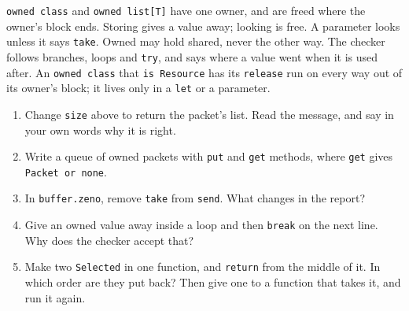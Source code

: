 \begin{summary}
\verb|owned class| and \verb|owned list[T]| have one owner, and are
freed where the owner's block ends. Storing gives a value away; looking
is free. A parameter looks unless it says \verb|take|. Owned may hold
shared, never the other way. The checker follows branches, loops and
\verb|try|, and says where a value went when it is used after. An
\verb|owned class| that \verb|is Resource| has its \verb|release| run
on every way out of its owner's block; it lives only in a \verb|let|
or a parameter.
\end{summary}

\begin{tryit}
\begin{enumerate}
\item Change \verb|size| above to return the packet's list. Read the
  message, and say in your own words why it is right.
\item Write a queue of owned packets with \verb|put| and \verb|get|
  methods, where \verb|get| gives \verb|Packet or none|.
\item In \verb|buffer.zeno|, remove \verb|take| from \verb|send|. What
  changes in the report?
\item Give an owned value away inside a loop and then \verb|break| on
  the next line. Why does the checker accept that?
\item Make two \verb|Selected| in one function, and \verb|return| from
  the middle of it. In which order are they put back? Then give one to
  a function that takes it, and run it again.
\end{enumerate}
\end{tryit}

